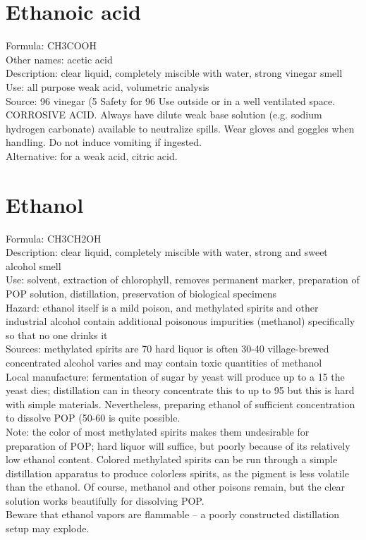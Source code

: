 \section{Ethanoic acid}
Formula: CH3COOH\\
Other names: acetic acid\\
Description: clear liquid, 
completely miscible with water, 
strong vinegar smell\\
Use: all purpose weak acid, 
volumetric analysis\\
Source: 96%
vinegar (5%
Safety for 96%
Use outside or in a well ventilated space. 
CORROSIVE ACID. 
Always have dilute weak base solution (e.g. 
sodium hydrogen carbonate) available to neutralize spills. 
Wear gloves and goggles when handling. 
Do not induce vomiting if ingested.\\
Alternative: for a weak acid, 
citric acid. 

\section{Ethanol}
Formula: CH3CH2OH\\
Description: clear liquid, 
completely miscible with water, 
strong and sweet alcohol smell\\
Use: solvent, 
extraction of chlorophyll, 
removes permanent marker, 
preparation of POP solution, 
distillation, 
preservation of biological specimens\\
Hazard: ethanol itself is a mild poison, 
and methylated spirits and other industrial alcohol contain 
additional poisonous impurities (methanol) 
specifically so that no one drinks it\\
Sources: methylated spirits are 70%
hard liquor is often 30-40%
village-brewed concentrated alcohol varies 
and may contain toxic quantities of methanol\\
Local manufacture: fermentation of sugar by yeast will produce 
up to a 15%
the yeast dies; 
distillation can in theory concentrate this to up to 95%
but this is hard with simple materials. 
Nevertheless, 
preparing ethanol of sufficient concentration to dissolve POP (50-60%
is quite possible.\\
Note: the color of most methylated spirits makes them undesirable 
for preparation of POP; 
hard liquor will suffice, 
but poorly because of its relatively low ethanol content. 
Colored methylated spirits can be run 
through a simple distillation apparatus to produce colorless spirits, 
as the pigment is less volatile than the ethanol. 
Of course, 
methanol and other poisons remain, 
but the clear solution works beautifully for dissolving POP.\\ 
Beware that ethanol vapors are flammable – 
a poorly constructed distillation setup may explode.


